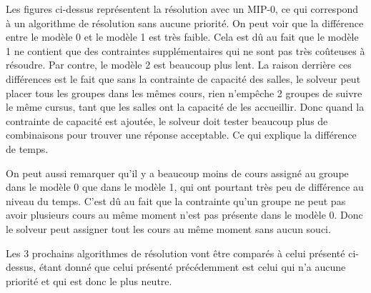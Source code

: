 Les figures ci-dessus représentent la résolution avec un MIP-0, ce qui correspond à un algorithme de résolution sans aucune priorité. On peut voir que la différence entre le modèle 0 et le modèle 1 est très faible. Cela est dû au fait que le modèle 1 ne contient que des contraintes supplémentaires qui ne sont pas très coûteuses à résoudre. Par contre, le modèle 2 est beaucoup plus lent. La raison derrière ces différences est le fait que sans la contrainte de capacité des salles, le solveur peut placer tous les groupes dans les mêmes cours, rien n'empêche 2 groupes de suivre le même cursus, tant que les salles ont la capacité de les accueillir. Donc quand la contrainte de capacité est ajoutée, le solveur doit tester beaucoup plus de combinaisons pour trouver une réponse acceptable. Ce qui explique la différence de temps.

On peut aussi remarquer qu'il y a beaucoup moins de cours assigné au groupe dans le modèle 0 que dans le modèle 1, qui ont pourtant très peu de différence au niveau du temps. C'est dû au fait que la contrainte qu'un groupe ne peut pas avoir plusieurs cours au même moment n'est pas présente dans le modèle 0. Donc le solveur peut assigner tout les cours au même moment sans aucun souci.

Les 3 prochains algorithmes de résolution vont être comparés à celui présenté ci-dessus, étant donné que celui présenté précédemment est celui qui n'a aucune priorité et qui est donc le plus neutre.

